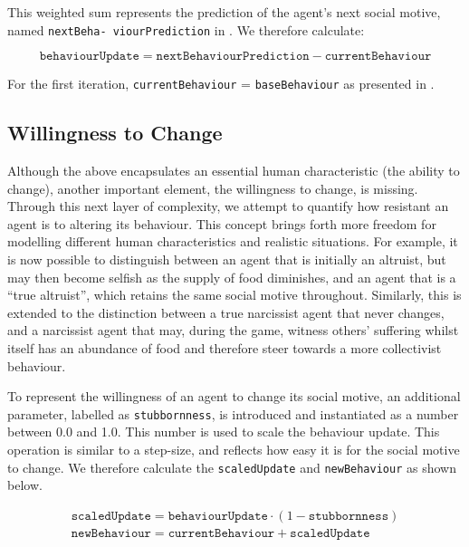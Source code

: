 This weighted sum represents the prediction of the agent's next social motive, named \texttt{nextBeha- viourPrediction} in . We therefore calculate:

\begin{equation}
    \texttt{behaviourUpdate} = \texttt{nextBehaviourPrediction} - \texttt{currentBehaviour}
\end{equation}


For the first iteration, \texttt{currentBehaviour} = \texttt{baseBehaviour} as presented in .

\subsection{Willingness to Change}
Although the above encapsulates an essential human characteristic (the ability to change), another important element, the willingness to change, is missing. Through this next layer of complexity, we attempt to quantify how resistant an agent is to altering its behaviour. This concept brings forth more freedom for modelling different human characteristics and realistic situations. For example, it is now possible to distinguish between an agent that is initially an altruist, but may then become selfish as the supply of food diminishes, and an agent that is a “true altruist”, which retains the same social motive throughout. Similarly, this is extended to the distinction between a true narcissist agent that never changes, and a narcissist agent that may, during the game, witness others' suffering whilst itself has an abundance of food and therefore steer towards a more collectivist behaviour.

To represent the willingness of an agent to change its social motive, an additional parameter, labelled as \texttt{stubbornness}, is introduced and instantiated as a number between 0.0 and 1.0. This number is used to scale the behaviour update. This operation is similar to a step-size, and reflects how easy it is for the social motive to change. We therefore calculate the \texttt{scaledUpdate} and \texttt{newBehaviour} as shown below.


\begin{equation}
    \begin{gathered}
    \texttt{scaledUpdate} = \texttt{behaviourUpdate} \cdot (1-\texttt{stubbornness}) \\
    \texttt{newBehaviour} = \texttt{currentBehaviour} + \texttt{scaledUpdate}
    \end{gathered}
\end{equation}


